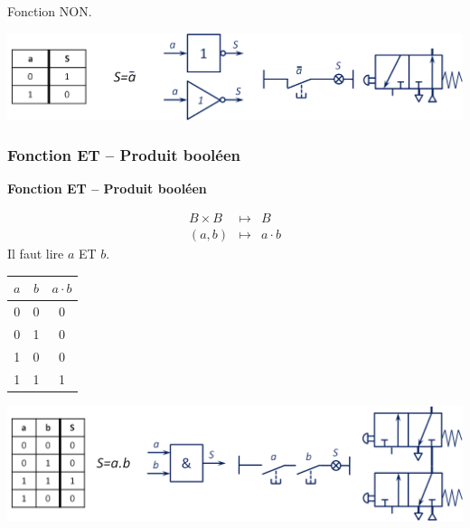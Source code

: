 \documentclass[10pt]{article}
\begin{document}
\begin{exemple}
Fonction NON.


\begin{center}
\includegraphics[width=.9\textwidth]{images/NON}
\end{center}

\end{exemple}


\subsubsection{Fonction ET -- Produit booléen}

\begin{defi}
\textbf{Fonction ET -- Produit booléen}

\begin{minipage}[c]{.45\linewidth}
\begin{eqnarray*}
B \times B &\longmapsto& B\\
(a,b) &\longmapsto& a \cdot b
\end{eqnarray*}
Il faut lire $a$ ET $b$. 
\end{minipage} \hfill
\begin{minipage}[c]{.45\linewidth}
\begin{center}
\begin{tabular}{|c|c||c|}
\hline
$a$ & $b$ & $a\cdot b$ \\
\hline
0 & 0 & 0 \\ \hline
0 & 1 & 0 \\ \hline
1 & 0 & 0 \\ \hline
1 & 1 & 1 \\ \hline
\end{tabular}
\end{center}
\end{minipage}
\end{defi}

\begin{exemple}

\begin{center}
\includegraphics[width=.9\textwidth]{images/ET}
\end{center}

\end{exemple}
\end{document}
